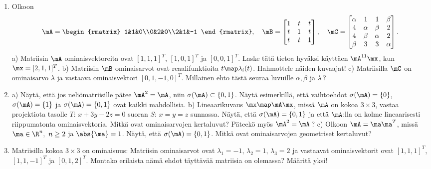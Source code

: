 \begin{enumerate}
\item
Olkoon
\[
\mA=\begin{rmatrix} 1&1&0\\0&2&0\\2&1&-1 \end{rmatrix}, \quad
\mB=\begin{bmatrix} 1&t&t\\t&1&t\\t&t&1 \end{bmatrix}, \quad
\mC=\begin{bmatrix}
    \alpha&1&1&\beta \\ 4&\alpha&\beta&2 \\ 4&\beta&\alpha&2 \\ \beta&3&3&\alpha    
    \end{bmatrix}.
\]
a) Matriisin $\mA$ ominaisvektoreita ovat $[1,1,1]^T$, $[1,0,1]^T$ ja $[0,0,1]^T$. Laske tätä
tietoa hyväksi käyttäen $\mA^{11}\mx$, kun $\mx=[2,1,1]^T$. \vspace{1mm}\newline
b) Matriisin $\mB$ ominaisarvot ovat reaalifunktioita $t\map\lambda_i(t)$. Hahmottele näiden
kuvaajat! \vspace{1mm}\newline
c) Matriisilla $\mC$ on ominaisarvo $\lambda$ ja vastaava ominaisvektori $[0,1,-1,0]^T$.
Millainen ehto tästä seuraa luvuille $\alpha,\beta$ ja $\lambda$\,?

\item
a) Näytä, että jos neliömatriisille pätee $\mA^2=\mA$, niin $\sigma(\mA)\subset\{0,1\}$. Näytä
esimerkillä, että vaihtoehdot $\sigma(\mA)=\{0\}$, $\sigma(\mA)=\{1\}$ ja $\sigma(\mA)=\{0,1\}$
ovat kaikki mahdollisia. \vspace{1mm}\newline
b) Lineaarikuvaus $\mx\map\mA\mx$, missä $\mA$ on kokoa $3 \times 3$, vastaa projektiota
tasolle $T:\,x+3y-2z=0$ suoran $S:\,x=y=z$ sunnassa. Näytä, että $\sigma(\mA)=\{0,1\}$ ja
että $\mA$:lla on kolme lineaarisesti riippumatonta ominaisvektoria. Mitkä ovat ominaisarvojen
kertaluvut? Päteekö myös $\mA^2=\mA$\,?
\vspace{1mm} \newline
c) Olkoon $\mA=\ma\ma^T$, missä $\ma\in\R^n,\ n \ge 2$ ja $\abs{\ma}=1$. Näytä, että 
$\sigma(\mA)=\{0,1\}$. Mitkä ovat ominaisarvojen geometriset kertaluvut?

\item
Matriisilla kokoa $3 \times 3$ on ominaisuus: Matriisin ominaisarvot ovat $\lambda_1=-1$, 
$\lambda_2=1$, $\lambda_3=2$ ja vastaavat ominaisvektorit ovat $[1,1,1]^T$,
$[1,1,-1]^T$ ja $[0,1,2]^T$. Montako erilaista nämä ehdot täyttävää matriisia on olemassa?
Määritä yksi!


\end{enumerate}
